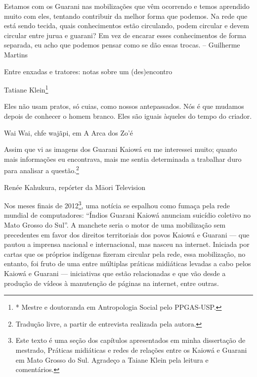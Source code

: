 \documentclass{article}
\begin{document}
Estamos com os Guarani nas mobiliza\c{c}\~oes que v\^em ocorrendo e
temos aprendido muito com eles, tentando contribuir da melhor forma que
podemos. Na rede que est\'a sendo tecida, quais conhecimentos est\~ao
circulando, podem circular e devem circular entre jurua e guarani? Em
vez de encarar esses conhecimentos de forma separada, eu acho que
podemos pensar como se d\~ao essas trocas. -- Guilherme Martins

Entre enxadas e tratores: notas sobre um (des)encontro

Tatiane Klein\footnote{* Mestre e doutoranda em Antropologia Social pelo
PPGAS-USP.}

Eles n\~ao usam pratos, s\'o cuias, como nossos antepassados. N\'os \'e
que mudamos depois de conhecer o homem branco. Eles s\~ao iguais
\`aqueles do tempo do criador.

Wai Wai, chfe waj\~api, em A Arca dos Zo{\textquoteright}\'e

Assim que vi as imagens dos Guarani Kaiow\'a eu me interessei muito;
quanto mais informa\c{c}\~oes eu encontrava, mais me sentia determinada
a trabalhar duro para analisar a quest\~ao.\footnote{ Tradu\c{c}\~ao
livre, a partir de entrevista realizada pela autora.}

Ren\'ee Kahukura, rep\'orter da M\=aori Television

Nos meses finais de 2012\footnote{ Este texto \'e uma se\c{c}\~ao dos
cap\'itulos apresentados em minha disserta\c{c}\~ao de mestrado,
Pr\'aticas midi\'aticas e redes de rela\c{c}\~oes entre os Kaiow\'a e
Guarani em Mato Grosso do Sul. Agrade\c{c}o a Taiane Klein pela leitura
e coment\'arios.}, uma not\'icia se espalhou como fuma\c{c}a pela rede
mundial de computadores: {\textquotedblleft}\'Indios Guarani Kaiow\'a
anunciam suic\'idio coletivo no Mato Grosso do Sul{\textquotedblright}.
A manchete seria o motor de uma mobiliza\c{c}\~ao sem precedentes em
favor dos direitos territoriais dos povos Kaiow\'a e Guarani --- que
pautou a imprensa nacional e internacional, mas nasceu na internet.
Iniciada por cartas que os pr\'oprios ind\'igenas fizeram circular pela
rede, essa mobiliza\c{c}\~ao, no entanto, foi fruto de uma entre
m\'ultiplas pr\'aticas midi\'aticas levadas a cabo pelos Kaiow\'a e
Guarani --- iniciativas que est\~ao relacionadas e que v\~ao desde a
produ\c{c}\~ao de v\'ideos \`a manuten\c{c}\~ao de p\'aginas na
internet, entre outras. 
\end{document}
